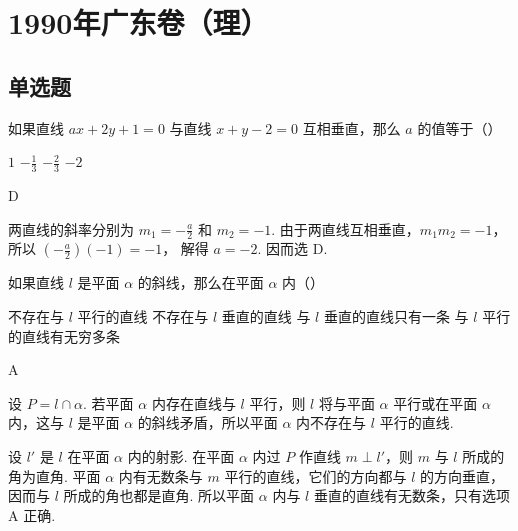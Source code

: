\documentclass[UTF8,a4paper,oneside,11pt]{ctexbook}
\begin{document}
\mainmatter

\chapter{1990年广东卷（理）}
\section{单选题}

\begin{problem}
如果直线 \(ax+2y+1=0\) 与直线 \(x+y-2=0\) 互相垂直，那么 \(a\) 的值等于（\quad）

\choices
    {\(1\)}
    {\(-\frac{1}{3}\)}
    {\(-\frac{2}{3}\)}
    {\(-2\)}
\end{problem}

\begin{answer}
D
\end{answer}

\begin{solution}
两直线的斜率分别为 \(m_1=-\frac{a}{2}\) 和 \(m_2=-1\). 由于两直线互相垂直，\(m_1m_2=-1\)，所以
\(\left(-\frac{a}{2}\right)(-1)=-1\)，
解得 \(a=-2\). 因而选 D.
\end{solution}

\begin{problem}
如果直线 \(l\) 是平面 \(\alpha\) 的斜线，那么在平面 \(\alpha\) 内（\quad）

\choices
    {不存在与 \(l\) 平行的直线}
    {不存在与 \(l\) 垂直的直线}
    {与 \(l\) 垂直的直线只有一条}
    {与 \(l\) 平行的直线有无穷多条}
\end{problem}

\begin{answer}
A
\end{answer}

\begin{solution}
设 \(P=l\cap\alpha\). 若平面 \(\alpha\) 内存在直线与 \(l\) 平行，则 \(l\) 将与平面 \(\alpha\) 平行或在平面 \(\alpha\) 内，这与 \(l\) 是平面 \(\alpha\) 的斜线矛盾，所以平面 \(\alpha\) 内不存在与 \(l\) 平行的直线.

设 \(l'\) 是 \(l\) 在平面 \(\alpha\) 内的射影. 在平面 \(\alpha\) 内过 \(P\) 作直线 \(m\perp l'\)，则 \(m\) 与 \(l\) 所成的角为直角. 平面 \(\alpha\) 内有无数条与 \(m\) 平行的直线，它们的方向都与 \(l\) 的方向垂直，因而与 \(l\) 所成的角也都是直角. 所以平面 \(\alpha\) 内与 \(l\) 垂直的直线有无数条，只有选项 A 正确.
\end{solution}
\end{document}
